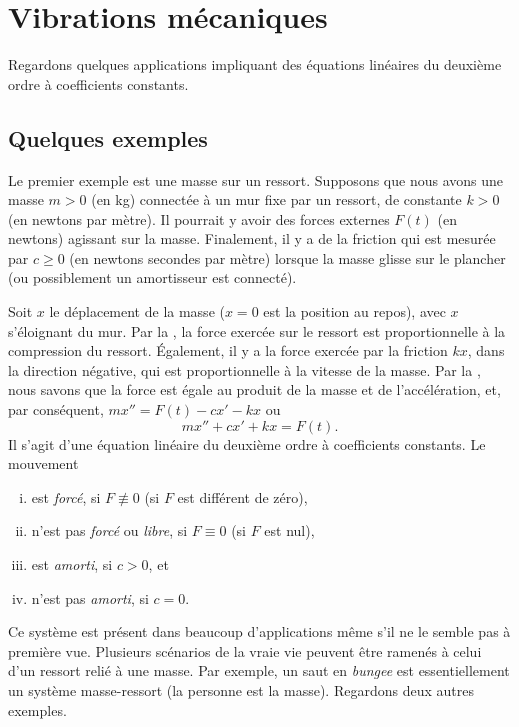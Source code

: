 \sectionnewpage
\section{Vibrations mécaniques} \label{sec:mv}


Regardons quelques applications impliquant des équations linéaires du deuxième ordre à coefficients constants. 
\subsection{Quelques exemples}

\begin{mywrapfigsimp}{2.0in}{2.3in}
\noindent
{}
\end{mywrapfigsimp}
Le premier exemple est une masse sur un ressort. Supposons que nous avons une masse $m > 0$ (en kg) connectée à un mur fixe par un ressort, de constante $k > 0$ (en newtons par mètre). Il pourrait y avoir des forces externes  $F(t)$ (en newtons) agissant sur la masse. Finalement, il y a de la friction qui est mesurée par $c \geq 0$ (en newtons secondes par mètre) lorsque la masse glisse sur le plancher (ou possiblement un amortisseur est connecté). 

Soit $x$ le déplacement de la masse  ($x=0$ est la position au repos), avec
$x$ s'éloignant du mur.  
Par la , la force exercée sur le ressort est proportionnelle à la compression du ressort.
Également, il y a  la force exercée par la friction $kx$, dans la direction négative, qui est proportionnelle à la vitesse de la masse.
Par la , nous savons que la force est égale au produit de la masse et de l'accélération, et, par conséquent, $mx'' = F(t)-cx'-kx$ ou
\begin{equation*}
mx'' + cx' + kx = F(t) .
\end{equation*}
Il s'agit d'une équation linéaire du deuxième ordre à coefficients constants. Le mouvement  
%
\begin{enumerate}[(i)]
\item  est \emph{forcé}, si $F \not\equiv 0$ (si $F$ est différent de zéro),
\item n'est pas \emph{ forcé } ou \emph{libre}, si $F \equiv 0$ (si $F$ est nul),
\item est \emph{amorti}, si $c > 0$, et
\item n'est pas \emph{amorti}, si $c = 0$.
\end{enumerate}
%
Ce système est présent dans beaucoup d'applications même s'il ne le semble pas à première vue. Plusieurs scénarios de la vraie vie peuvent être ramenés à celui d'un ressort relié à une masse. Par exemple, un saut en \emph{bungee} est essentiellement un système masse-ressort (la personne est la masse).  Regardons deux autres exemples.  

